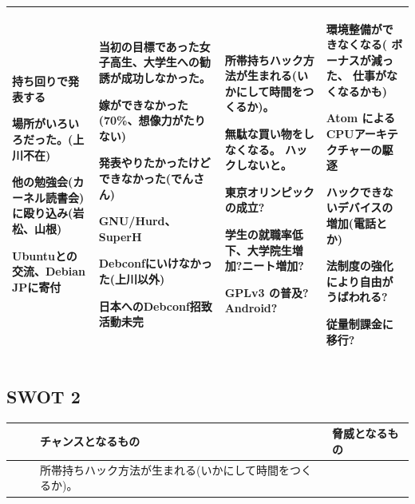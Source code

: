 \documentclass[mingoth,a4paper]{jsarticle}
\begin{document}
\begin{commandline}
{\begin{tabular}[t]{|p{8em}|p{8em}|p{8em}|p{8em}|}
持ち回りで発表する

場所がいろいろだった。(上川不在)

他の勉強会(カーネル読書会)に殴り込み(岩松、山根)

Ubuntuとの交流、Debian JPに寄付



&

当初の目標であった女子高生、大学生への勧誘が成功しなかった。

嫁ができなかった(70\%、想像力がたりない)

発表やりたかったけどできなかった(でんさん)

GNU/Hurd、SuperH

Debconfにいけなかった(上川以外)

日本へのDebconf招致活動未完

&
	 
所帯持ちハック方法が生まれる(いかにして時間をつくるか)。

無駄な買い物をしなくなる。
ハックしないと。

東京オリンピックの成立?

学生の就職率低下、大学院生増加?ニート増加?

GPLv3 の普及?
Android?

&

環境整備ができなくなる(
ボーナスが減った、
仕事がなくなるかも)

Atom によるCPUアーキテクチャーの駆逐

ハックできないデバイスの増加(電話とか)

法制度の強化により自由がうばわれる?

従量制課金に移行?

\\
\hline
\end{tabular}
}

\clearpage

\subsection{SWOT 2}

\begin{tabular}[t]{|p{4em}|p{11em}|p{11em}|p{11em}|}
\hline
 &  & チャンスとなるもの & 脅威となるもの  \\\hline
\vspace{0.2\vsize}~

 & & 
	 
所帯持ちハック方法が生まれる(いかにして時間をつくるか)。


\end{tabular}
\end{commandline}
\end{document}
